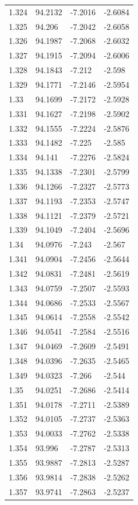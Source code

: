 \begin{tabular}{llll}
1.324 & 94.2132 & -7.2016 & -2.6084 \\
1.325 & 94.206 & -7.2042 & -2.6058 \\
1.326 & 94.1987 & -7.2068 & -2.6032 \\
1.327 & 94.1915 & -7.2094 & -2.6006 \\
1.328 & 94.1843 & -7.212 & -2.598 \\
1.329 & 94.1771 & -7.2146 & -2.5954 \\
1.33 & 94.1699 & -7.2172 & -2.5928 \\
1.331 & 94.1627 & -7.2198 & -2.5902 \\
1.332 & 94.1555 & -7.2224 & -2.5876 \\
1.333 & 94.1482 & -7.225 & -2.585 \\
1.334 & 94.141 & -7.2276 & -2.5824 \\
1.335 & 94.1338 & -7.2301 & -2.5799 \\
1.336 & 94.1266 & -7.2327 & -2.5773 \\
1.337 & 94.1193 & -7.2353 & -2.5747 \\
1.338 & 94.1121 & -7.2379 & -2.5721 \\
1.339 & 94.1049 & -7.2404 & -2.5696 \\
1.34 & 94.0976 & -7.243 & -2.567 \\
1.341 & 94.0904 & -7.2456 & -2.5644 \\
1.342 & 94.0831 & -7.2481 & -2.5619 \\
1.343 & 94.0759 & -7.2507 & -2.5593 \\
1.344 & 94.0686 & -7.2533 & -2.5567 \\
1.345 & 94.0614 & -7.2558 & -2.5542 \\
1.346 & 94.0541 & -7.2584 & -2.5516 \\
1.347 & 94.0469 & -7.2609 & -2.5491 \\
1.348 & 94.0396 & -7.2635 & -2.5465 \\
1.349 & 94.0323 & -7.266 & -2.544 \\
1.35 & 94.0251 & -7.2686 & -2.5414 \\
1.351 & 94.0178 & -7.2711 & -2.5389 \\
1.352 & 94.0105 & -7.2737 & -2.5363 \\
1.353 & 94.0033 & -7.2762 & -2.5338 \\
1.354 & 93.996 & -7.2787 & -2.5313 \\
1.355 & 93.9887 & -7.2813 & -2.5287 \\
1.356 & 93.9814 & -7.2838 & -2.5262 \\
1.357 & 93.9741 & -7.2863 & -2.5237 \\

\end{tabular}
